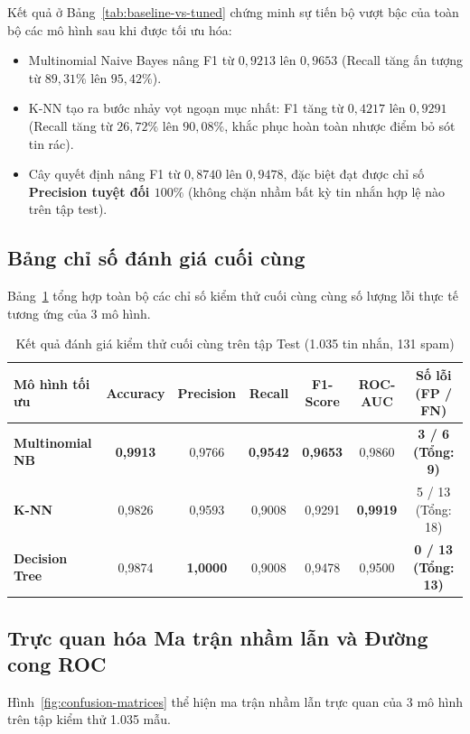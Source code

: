 Kết quả ở Bảng~\ref{tab:baseline-vs-tuned} chứng minh sự tiến bộ vượt bậc của toàn bộ các mô hình sau khi được tối ưu hóa:
\begin{itemize}
    \item Multinomial Naive Bayes nâng F1 từ $0,9213$ lên \textbf{$0,9653$} (Recall tăng ấn tượng từ $89,31\%$ lên $95,42\%$).
    \item K-NN tạo ra bước nhảy vọt ngoạn mục nhất: F1 tăng từ $0,4217$ lên \textbf{$0,9291$} (Recall tăng từ $26,72\%$ lên $90,08\%$, khắc phục hoàn toàn nhược điểm bỏ sót tin rác).
    \item Cây quyết định nâng F1 từ $0,8740$ lên \textbf{$0,9478$}, đặc biệt đạt được chỉ số \textbf{Precision tuyệt đối $100\%$} (không chặn nhầm bất kỳ tin nhắn hợp lệ nào trên tập test).
\end{itemize}

\subsection{Bảng chỉ số đánh giá cuối cùng}
Bảng~\ref{tab:ket-qua-cuoi-cung} tổng hợp toàn bộ các chỉ số kiểm thử cuối cùng cùng số lượng lỗi thực tế tương ứng của 3 mô hình.

\begin{table}[H]
\centering
\caption{Kết quả đánh giá kiểm thử cuối cùng trên tập Test (1.035 tin nhắn, 131 spam)}
\label{tab:ket-qua-cuoi-cung}
\begin{tabular}{|l|c|c|c|c|c|c|}
\hline
\textbf{Mô hình tối ưu} & \textbf{Accuracy} & \textbf{Precision} & \textbf{Recall} & \textbf{F1-Score} & \textbf{ROC-AUC} & \textbf{Số lỗi (FP / FN)} \\
\hline
\textbf{Multinomial NB} & \textbf{0,9913} & 0,9766 & \textbf{0,9542} & \textbf{0,9653} & 0,9860 & \textbf{3 / 6 (Tổng: 9)} \\
\hline
\textbf{K-NN} & 0,9826 & 0,9593 & 0,9008 & 0,9291 & \textbf{0,9919} & 5 / 13 (Tổng: 18) \\
\hline
\textbf{Decision Tree} & 0,9874 & \textbf{1,0000} & 0,9008 & 0,9478 & 0,9500 & \textbf{0 / 13 (Tổng: 13)} \\
\hline
\end{tabular}
\end{table}

\subsection{Trực quan hóa Ma trận nhầm lẫn và Đường cong ROC}
Hình~\ref{fig:confusion-matrices} thể hiện ma trận nhầm lẫn trực quan của 3 mô hình trên tập kiểm thử 1.035 mẫu.

